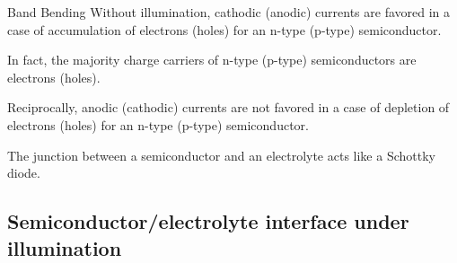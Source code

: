 \documentclass[10pt,compress,handout]{beamer}
\begin{document}
\begin{frame}[allowframebreaks=1.0]{Band Bending}
        Without illumination, cathodic (anodic) currents are favored in a case of 
        accumulation of electrons (holes) for an n-type (p-type) semiconductor. 
        
        In fact, the majority charge carriers of n-type (p-type) semiconductors are 
        electrons (holes). 
        
        Reciprocally, anodic (cathodic) currents are not favored in a case of 
        depletion of electrons (holes) for an n-type (p-type) semiconductor. 
        
        The junction between a semiconductor and an electrolyte acts like a Schottky diode.
    \end{frame}

\subsection{Semiconductor/electrolyte interface under illumination}
\end{document}
